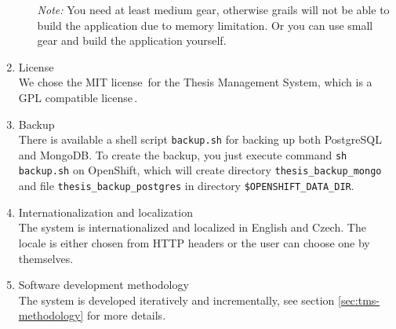 \begin{enumerate}
\begin{enumerate}
        \item[\emph{Note:}] You need at least medium gear, otherwise grails will not be able to build the application due to memory limitation. Or you can use small gear and build the application yourself.
    \end{enumerate}

    \item License\\
    We chose the MIT license\,\cite{mit-license} for the Thesis Management System, which is a GPL compatible license\,\cite{gpl-compatible-licenses}.

    \item Backup\\
    There is available a shell script \texttt{backup.sh} for backing up both PostgreSQL and MongoDB. To create the backup, you just execute command \texttt{sh backup.sh} on OpenShift, which will create directory \texttt{thesis\_backup\_mongo} and file \texttt{thesis\_backup\_postgres} in directory \texttt{\$OPENSHIFT\_DATA\_DIR}.

    \item Internationalization and localization\\
    The system is internationalized and localized in English and Czech. The locale is either chosen from HTTP headers or the user can choose one by themselves.

    \item Software development methodology\\
    The system is developed iteratively and incrementally, see section \ref{sec:tms-methodology} for more details.

\end{enumerate}